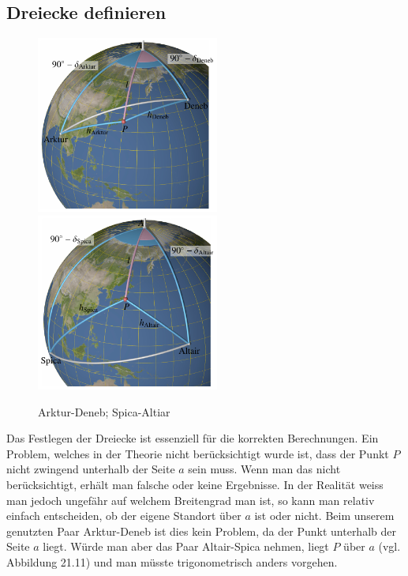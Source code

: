 \subsection{Dreiecke definieren}
\begin{figure} 
	\begin{center}
	\includegraphics[width=6cm]{papers/nav/bilder/beispiele1.pdf}
	\includegraphics[width=6cm]{papers/nav/bilder/beispiele2.pdf}
	\caption{Arktur-Deneb; Spica-Altiar}
\end{center}
\end{figure}
Das Festlegen der Dreiecke ist essenziell für die korrekten Berechnungen.
Ein Problem, welches in der Theorie nicht berücksichtigt wurde ist, dass der Punkt $P$ nicht zwingend unterhalb der Seite $a$ sein muss. 
Wenn man das nicht berücksichtigt, erhält man falsche oder keine Ergebnisse. 
In der Realität weiss man jedoch ungefähr auf welchem Breitengrad man ist, so kann man relativ einfach entscheiden, ob der eigene Standort über $a$ ist oder nicht.
Beim unserem genutzten Paar Arktur-Deneb ist dies kein Problem, da der Punkt unterhalb der Seite $a$ liegt. 
Würde man aber das Paar Altair-Spica nehmen, liegt $P$ über $a$ (vgl. Abbildung 21.11) und man müsste trigonometrisch anders vorgehen. 

